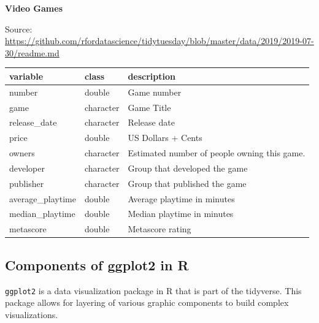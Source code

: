 \documentclass[
]{book}
\begin{document}
\textbf{Video Games}

Source: \url{https://github.com/rfordatascience/tidytuesday/blob/master/data/2019/2019-07-30/readme.md}

\begin{longtable}[]{@{}
  >{\raggedright\arraybackslash}p{}
  >{\raggedright\arraybackslash}p{}
  >{\raggedright\arraybackslash}p{}@{}}
\toprule\noalign{}
\begin{minipage}[b]{\linewidth}\raggedright
variable
\end{minipage} & \begin{minipage}[b]{\linewidth}\raggedright
class
\end{minipage} & \begin{minipage}[b]{\linewidth}\raggedright
description
\end{minipage} \\
\midrule\noalign{}
\endhead
\bottomrule\noalign{}
\endlastfoot
number & double & Game number \\
game & character & Game Title \\
release\_date & character & Release date \\
price & double & US Dollars + Cents \\
owners & character & Estimated number of people owning this game. \\
developer & character & Group that developed the game \\
publisher & character & Group that published the game \\
average\_playtime & double & Average playtime in minutes \\
median\_playtime & double & Median playtime in minutes \\
metascore & double & Metascore rating \\
\end{longtable}

\subsection*{Components of ggplot2 in R}\label{components-of-ggplot2-in-r}

\texttt{ggplot2} is a data visualization package in R that is part of the tidyverse. This package allows for layering of various graphic components to build complex visualizations.
\end{document}
